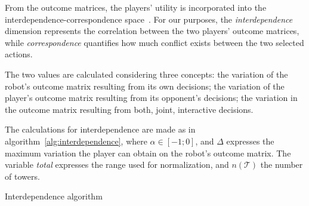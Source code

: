 From the outcome matrices, the players' utility is incorporated into the interdependence-correspondence space~\citep{wagner_acting_2011}. For our purposes, the \textit{interdependence} dimension represents the correlation between the two players' outcome matrices, while \textit{correspondence} quantifies how much conflict exists between the two selected actions.

The two values are calculated considering three concepts: the variation of the robot's outcome matrix resulting from its own decisions; the variation of the player's outcome matrix resulting from its opponent's decisions; the variation in the outcome matrix resulting from both, joint, interactive decisions.

The calculations for interdependence are made as in algorithm~\ref{alg:interdependence}, where $\alpha \in[-1;0]$, and $\Delta$ expresses the maximum variation the player can obtain on the robot's outcome matrix. The variable \textit{total} expresses the range used for normalization, and $n(\mathcal{T})$ the number of towers.

\begin{algorithm}[h]
\SetAlgoLined
{}
\BlankLine
{}
\caption{Interdependence algorithm}
\label{alg:interdependence}
\end{algorithm}

